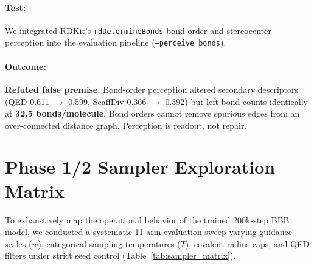\documentclass[12pt, a4paper]{article}
\begin{document}
\paragraph{Test:} We integrated RDKit's \texttt{rdDetermineBonds} bond-order and stereocenter perception into the evaluation pipeline (\texttt{--perceive\_bonds}).
\paragraph{Outcome:} \textbf{Refuted false premise.} Bond-order perception altered secondary descriptors (QED 0.611 $\to$ 0.599, ScaffDiv 0.366 $\to$ 0.392) but left bond counts identically at \textbf{32.5 bonds/molecule}. Bond orders cannot remove spurious edges from an over-connected distance graph. Perception is readout, not repair.

\section{Phase 1/2 Sampler Exploration Matrix}

To exhaustively map the operational behavior of the trained 200k-step BBB model, we conducted a systematic 11-arm evaluation sweep varying guidance scales ($w$), categorical sampling temperatures ($T$), covalent radius caps, and QED filters under strict seed control (Table~\ref{tab:sampler_matrix}).
\end{document}

